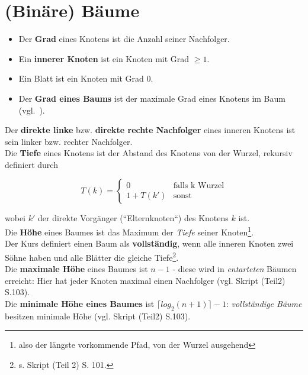 \section{(Binäre) Bäume}


\begin{itemize}
    \item Der \textbf{Grad} eines Knotens ist die Anzahl seiner Nachfolger.
    \item Ein \textbf{innerer Knoten} ist ein Knoten mit Grad $\geq 1$.
    \item Ein Blatt ist ein Knoten mit Grad $0$.
    \item Der \textbf{Grad eines Baums} ist der maximale Grad eines Knotens im Baum (vgl.~\cite[102]{GD18c}).
\end{itemize}


\noindent
Der \textbf{direkte linke} bzw. \textbf{direkte rechte Nachfolger} eines inneren Knotens ist sein linker bzw. rechter Nachfolger.\\

\noindent
Die \textbf{Tiefe} eines Knotens ist der Abstand des Knotens von der Wurzel, rekursiv definiert durch

\begin{equation}
    T(k) = \begin{cases}
            0 &\text{falls k Wurzel}\\
            1 + T(k') &\text{sonst}
    \end{cases}
\end{equation}

wobei $k'$ der direkte Vorgänger (``Elternknoten``) des Knotens $k$ ist.\\

\noindent
Die \textbf{Höhe} eines Baumes ist das Maximum der \textit{Tiefe} seiner Knoten\footnote{also der längste vorkommende Pfad,  von der Wurzel ausgehend}.\\

\noindent
Der Kurs definiert einen Baum als \textbf{vollständig}, wenn alle inneren Knoten zwei Söhne haben und alle Blätter die gleiche Tiefe\footnote{
    s. Skript (Teil 2) S. 101.
}.\\

\noindent
Die \textbf{maximale Höhe} eines Baumes ist $n - 1$ - diese wird in \textit{entarteten} Bäumen erreicht: Hier hat jeder Knoten maximal einen Nachfolger (vgl. Skript (Teil2) S.103).\\

\noindent
Die \textbf{minimale Höhe eines Baumes} ist $\lceil log_2(n + 1) \rceil - 1$: \textit{vollständige Bäume} besitzen minimale Höhe (vgl. Skript (Teil2) S.103).\\


